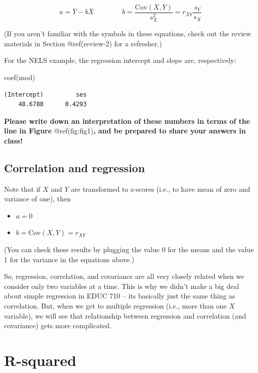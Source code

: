 \documentclass[
  letterpaper,
  DIV=11,
  numbers=noendperiod]{scrreprt}
\newenvironment{Shaded}{\begin{snugshade}}{\end{snugshade}}
\newcommand{\FunctionTok}[1]{\textcolor[rgb]{0.28,0.35,0.67}{#1}}
\newcommand{\NormalTok}[1]{\textcolor[rgb]{0.00,0.23,0.31}{#1}}
\providecommand{\tightlist}{%
  \setlength{\itemsep}{0pt}\setlength{\parskip}{0pt}}\usepackage{longtable,booktabs,array}
\begin{document}
\[ 
a = \bar Y - b \bar X \quad \quad \quad \quad b = \frac{\text{Cov}(X, Y)}{s^2_X} = r_{XY} \frac{s_Y}{s_X}
\]

(If you aren't familiar with the symbols in these equations, check out
the review materials in Section @ref(review-2) for a refresher.)

For the NELS example, the regression intercept and slope are,
respectively:

\begin{Shaded}
\begin{Highlighting}[]
\FunctionTok{coef}\NormalTok{(mod)}
\end{Highlighting}
\end{Shaded}

\begin{verbatim}
(Intercept)         ses 
    48.6780      0.4293 
\end{verbatim}

\textbf{Please write down an interpretation of these numbers in terms of
the line in Figure} @ref(fig:fig1)\textbf{, and be prepared to share
your answers in class!}

\hypertarget{correlation-and-regression}{%
\subsection{Correlation and
regression}\label{correlation-and-regression}}

Note that if \(X\) and \(Y\) are transformed to z-scores (i.e., to have
mean of zero and variance of one), then

\begin{itemize}
\tightlist
\item
  \(a = 0\)
\item
  \(b = \text{Cov}(X, Y) = r_{XY}\)
\end{itemize}

(You can check these results by plugging the value 0 for the means and
the value 1 for the variance in the equations above.)

So, regression, correlation, and covariance are all very closely related
when we consider only two variables at a time. This is why we didn't
make a big deal about simple regression in EDUC 710 -- its basically
just the same thing as correlation. But, when we get to multiple
regression (i.e., more than one \(X\) variable), we will see that
relationship between regression and correlation (and covariance) gets
more complicated.

\hypertarget{rsquared-2}{%
\section{R-squared}\label{rsquared-2}}
\end{document}
